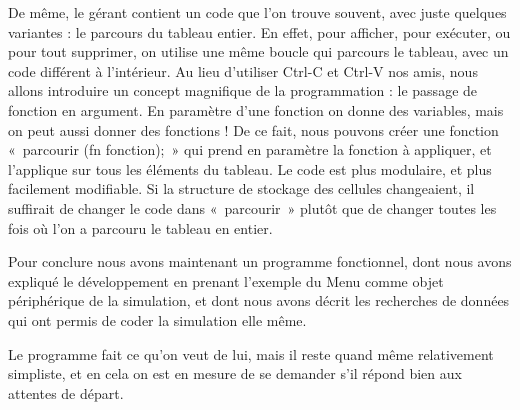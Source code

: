 	De même, le gérant contient un code que l'on trouve souvent, avec juste quelques variantes : le parcours du tableau entier. En effet, pour afficher, pour exécuter, ou pour tout supprimer, on utilise une même boucle qui parcours le tableau, avec un code différent à l'intérieur. Au lieu d'utiliser Ctrl-C et Ctrl-V nos amis, nous allons introduire un concept magnifique de la programmation : le passage de fonction en argument. En paramètre d'une fonction on donne des variables, mais on peut aussi donner des fonctions ! De ce fait, nous pouvons créer une fonction «~parcourir (fn fonction);~» qui prend en paramètre la fonction à appliquer, et l'applique sur tous les éléments du tableau. Le code est plus modulaire, et plus facilement modifiable. Si la structure de stockage des cellules changeaient, il suffirait de changer le code dans «~parcourir~» plutôt que de changer toutes les fois où l'on a parcouru le tableau en entier. 


  Pour conclure nous avons maintenant un programme fonctionnel, dont nous avons expliqué le développement en prenant l'exemple du Menu comme objet périphérique de la simulation, et dont nous avons décrit les recherches de données qui ont permis de coder la simulation elle même.
  
  Le programme fait ce qu'on veut de lui, mais il reste quand même relativement simpliste, et en cela on est en mesure de se demander s'il répond bien aux attentes de départ.
